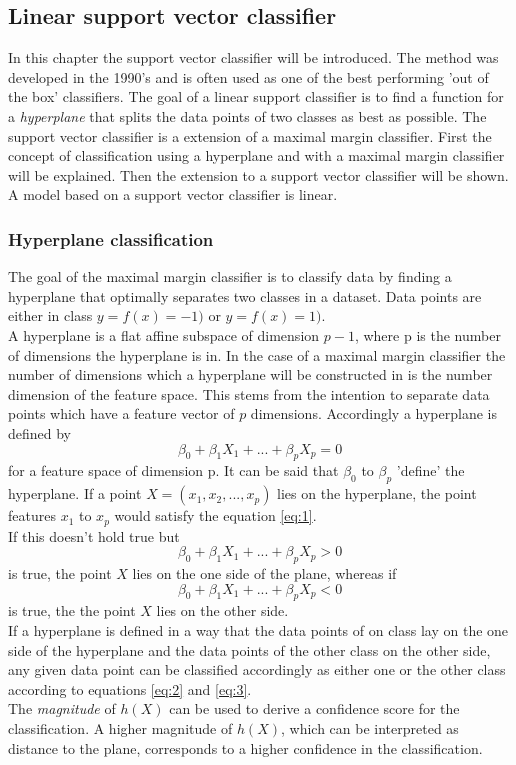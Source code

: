 \subsection{Linear support vector classifier}
In this chapter the support vector classifier will be introduced. The method was developed in the 1990’s and is often used as one of the best performing 'out of the box' classifiers. The goal of a linear support classifier is to find a function for a \emph{hyperplane} that splits the data points of two classes as best as possible. The support vector classifier is a extension of a maximal margin classifier. First  the concept of classification using a hyperplane and with a maximal margin classifier will be explained. Then the extension to a support vector classifier will be shown.
A model based on a support vector classifier is linear.
\subsubsection{Hyperplane classification}
The goal of the maximal margin classifier is to classify data by finding a hyperplane that optimally separates two classes in a dataset. Data points are either in class $y=f(x)=-1)$ or $y=f(x)=1)$. 
\\
A hyperplane is a flat affine subspace of dimension $p-1$, where p is the number of dimensions the hyperplane is in. In the case of a maximal margin classifier the number of dimensions which a hyperplane will be constructed in is the number dimension of the feature space. This stems from the intention to separate data points which have a feature vector of $p$ dimensions. Accordingly a hyperplane is defined by
\begin{equation} \label{eq:1}
\beta_0 + \beta_1 X_1 + ... + \beta_p X_p = 0
\end{equation}
for a feature space of dimension p. It can be said that $\beta_0$  to $\beta_p$ 'define' the hyperplane.
If a point $X=(x_1,x_2,...,x_p)$ lies on the hyperplane, the point features $x_1$ to $x_p$ would satisfy the equation \ref{eq:1}.
\\
If this doesn't hold true but
\begin{equation} \label{eq:2}
\beta _0 + \beta _1 X_1 + ... + \beta_p X_p > 0
\end{equation}
is true, the point $X$ lies on the one side of the plane, whereas if 
\begin{equation} \label{eq:3}
\beta_0 + \beta_1 X_1 + ... + \beta_p X_p < 0
\end{equation}
is true, the the point $X$ lies on the other side. 
\\
If a hyperplane is defined in a way that the data points of on class lay on the one side of the hyperplane and the data points of the other class on the other side, any given data point can be classified accordingly as either one or the other class according to equations \ref{eq:2} and \ref{eq:3}.
\\
The \emph{magnitude} of $h(X)$ can be used to derive a confidence score for the classification. A higher magnitude of $h(X)$, which can be interpreted as distance to the plane, corresponds to a higher confidence in the classification.


